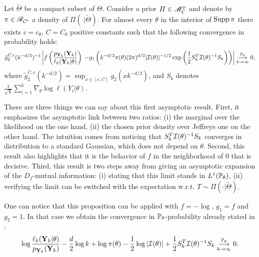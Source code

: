 \begin{prop}\label{prop:PSGSA:cvptheta}
    Let $\tilde\Theta$ be a compact subset of $\Theta$.
    Consider a prior $\varPi\in\sM^\nu_\cC$ and denote by $\pi\in\sR_{\cC^b}$ a density of $\varPi(\cdot|\tilde\Theta)$.%
    For almost every $\theta$ in the interior of $\Supp\pi$ there exists $c=c_\theta,\,C=C_\theta$ positive constants such that the following convergence in probability holds:
    \begin{equation}
        \label{eq:cvinproba}
        \tilde g_2^{C,c}(k^{-d/2})^{-1}\left| f\left(\frac{p_{\mbf Y_k}(\mbf Y_k)}{\ell_k(\mbf Y_k|\theta)}\right) \right.            \left. - g_1\left(k^{-d/2}\pi(\theta)(2\pi)^{d/2}|\cI(\theta)|^{-1/2}\exp\left(\frac{1}{2}S_k^T\cI(\theta)^{-1}S_k \right)\right) \right| %
                \conv[\PP_{\theta}]{k\rightarrow\infty} 0,
    \end{equation}
    where $\tilde g_2^{C,c}(k^{-d/2})=\sup_{x\in[c,C]} g_2(xk^{-d/2})$, and $S_k$ denotes $\frac{1}{\sqrt{k}}\sum_{i=1}^k\nabla_\theta\log\ell(Y_i|\theta)$.
\end{prop}


There are three things we can say about this first asymptotic result. %
First, it emphasizes the asymptotic link {between two ratios: (i) the marginal over the likelihood on the one hand, (ii) the chosen prior density over Jeffreys one on the other hand.}  
The intuition comes from noticing that $S_k^T\cI(\theta)^{-1}S_k$ converges in distribution to a standard Gaussian, which does not depend on $\theta$.
Second, 
this result also highlights that it is the behavior of $f$ in the neighborhood of $0$ that is decisive.
Third, this result is two steps away from giving an asymptotic expansion of the $D_f$-mutual information: (i) stating that this limit stands in $L^1(\PP_{\theta})$, (ii) verifying the limit can be switched with the expectation w.r.t. $T\sim\varPi(\cdot|\tilde\Theta)$.




One can notice that this proposition can be applied with $f=-\log$, $g_1=f$ and $g_2=1$. 
In that case we obtain the convergence in $\PP_\theta$-probability already stated in \cite{clarke_information-theoretic_1990}:
    \begin{equation}
        \log\frac{\ell_k(\mbf Y_k|\theta)}{p_{\mbf Y_k}(\mbf Y_k)} - \frac{d}{2}\log k + \log\pi(\theta) - \frac{1}{2}\log|\cI(\theta)| +\frac{1}{2}S_k^T\cI(\theta)^{-1}S_k  \conv[\PP_\theta]{k\rightarrow\infty} 0.
    \end{equation}







